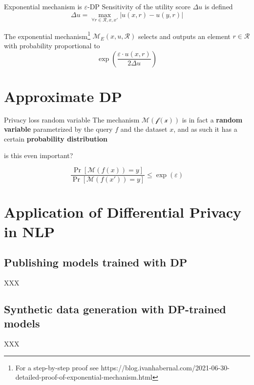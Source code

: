 \documentclass[12pt,aspectratio=169,handout]{beamer}
\begin{document}
\begin{frame}{Exponential mechanism is $\varepsilon$-DP}
Sensitivity of the utility score $\Delta u$ is defined
$$
\Delta u = \max_{\forall r \in \mathcal{R}, x, x'} |u(x, r) - u(y, r)|
$$

The exponential mechanism\footnote{
For a step-by-step proof see https://blog.ivanhabernal.com/2021-06-30-detailed-proof-of-exponential-mechanism.html
} $\mathcal{M}_E(x, u, \mathcal{R})$ selects and outputs an element $r \in \mathcal{R}$ with probability proportional to
$$\exp \left( \frac{\varepsilon \cdot u(x,r)}{2\Delta u}\right)$$

\end{frame}

\section{Approximate DP}

\begin{frame}{Privacy loss random variable}
The mechanism $\mathcal{M(f(x))}$ is in fact a \textbf{random variable} parametrized by the query $f$ and the dataset $x$, and as such it has a certain \textbf{probability distribution}

is this even important?

$$
\frac{
	\Pr \left[ \mathcal{M}(f(x)) = y  \right]
}{
	\Pr \left[ \mathcal{M}(f(x')) = y  \right]
}
\leq \exp(\varepsilon)
$$


\end{frame}


\section{Application of Differential Privacy in NLP}

\subsection{Publishing models trained with DP}

\begin{frame}{XXX}
	
\end{frame}

\subsection{Synthetic data generation with DP-trained models}

\begin{frame}{XXX}
	
\end{frame}
\end{document}
